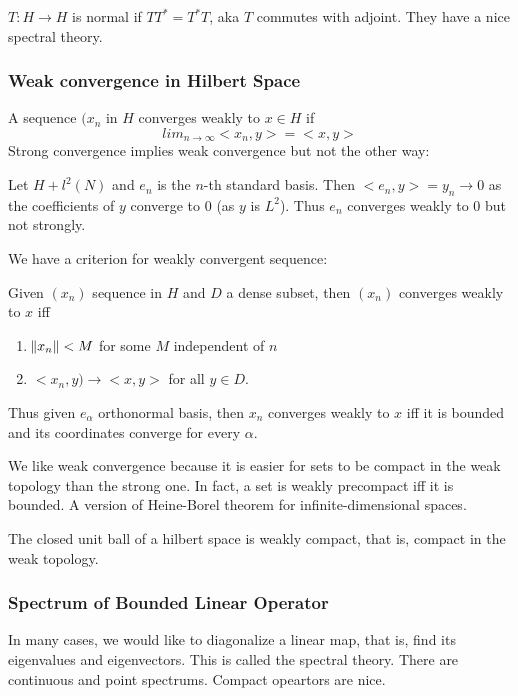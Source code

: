 \documentclass[main.tex]{subfiles}
\begin{document}
\begin{definition}
$T: H \rightarrow H$ is normal if $TT^ * = T^* T$, aka $T$ commutes with adjoint. They have a nice spectral theory.
\end{definition}

\subsubsection{Weak convergence in Hilbert Space}
A sequence $(x_n$ in $H$ converges weakly to $x \in H$ if
$$
lim_{n \rightarrow \infty}<x_n, y> = <x,y>
$$
Strong convergence implies weak convergence but not the other way:

\begin{example}
Let $H + l^2(N)$ and $e_n$ is the $n$-th standard basis. Then $<e_n, y> = y_n \rightarrow 0$ as the coefficients of $y$ converge to $0$ (as $y$ is $L^2$). Thus $e_n$ converges weakly to $0$ but not strongly.
\end{example}

We have a criterion for weakly convergent sequence:

\begin{theorem}
Given $(x_n)$ sequence in $H$ and $D$ a dense subset, then $(x_n)$ converges weakly to $x$ iff 
\begin{enumerate}
    \item $\norm{x_n} < M$ for some $M$ independent of $n$
    \item $<x_n, y) \rightarrow <x,y>$ for all $y \in D$.
\end{enumerate}
\end{theorem}

Thus given $e_\alpha$ orthonormal basis, then $x_n$ converges weakly to $x$ iff it is bounded and its coordinates converge for every $\alpha$.

We like weak convergence because it is easier for sets to be compact in the weak topology than the strong one. In fact, a set is weakly precompact iff it is bounded. A version of Heine-Borel theorem for infinite-dimensional spaces. 

\begin{theorem}
The closed unit ball of a hilbert space is weakly compact, that is, compact in the weak topology.
\end{theorem}

\subsubsection{Spectrum of Bounded Linear Operator}
In many cases, we would like to diagonalize a linear map, that is, find its eigenvalues and eigenvectors. This is called the spectral theory. There are continuous and point spectrums. Compact opeartors are nice.
\end{document}
